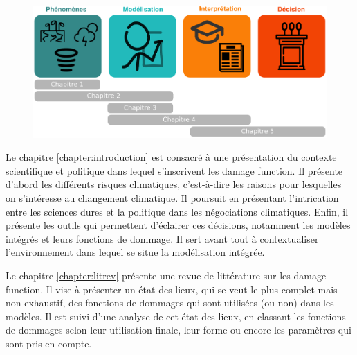 \begin{figure}
    \centering
    \includegraphics[width=\textwidth]{illustrations/intro.png}
    \label{fig:enter-label}
\end{figure}



Le  chapitre \ref{chapter:introduction} est consacré à une présentation du contexte scientifique et politique dans lequel s'inscrivent les \gls{damage function}. Il présente d'abord les différents risques climatiques, c'est-à-dire les raisons pour lesquelles on s'intéresse au changement climatique. Il poursuit en présentant l'intrication entre les sciences dures et la politique dans les négociations climatiques. Enfin, il présente les outils qui permettent d'éclairer ces décisions, notamment les modèles intégrés et leurs fonctions de dommage. Il sert avant tout à contextualiser l'environnement dans lequel se situe la modélisation intégrée. 

Le chapitre \ref{chapter:litrev} présente une revue de littérature sur les \gls{damage function}. Il vise à présenter un état des lieux, qui se veut le plus complet mais non exhaustif, des fonctions de dommages qui sont utilisées (ou non) dans les modèles. Il est suivi d'une analyse de cet état des lieux, en classant les fonctions de dommages selon leur utilisation finale, leur forme ou encore les paramètres qui sont pris en compte. 


